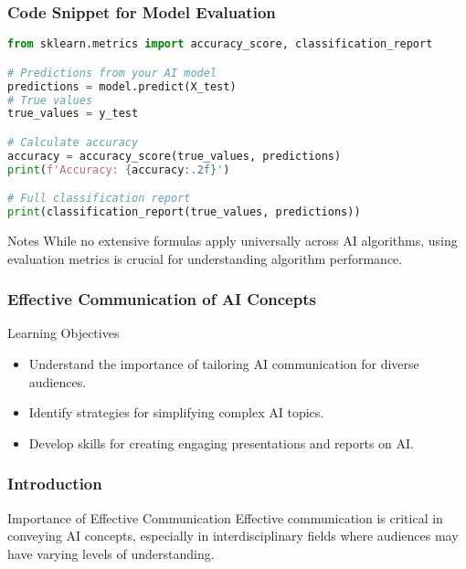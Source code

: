 \documentclass[aspectratio=169]{beamer}
\begin{document}
\begin{frame}[fragile]
    \frametitle{Code Snippet for Model Evaluation}
    \begin{lstlisting}[language=Python]
from sklearn.metrics import accuracy_score, classification_report

# Predictions from your AI model
predictions = model.predict(X_test)
# True values
true_values = y_test

# Calculate accuracy
accuracy = accuracy_score(true_values, predictions)
print(f'Accuracy: {accuracy:.2f}')

# Full classification report
print(classification_report(true_values, predictions))
    \end{lstlisting}
    \begin{block}{Notes}
        While no extensive formulas apply universally across AI algorithms, using evaluation metrics is crucial for understanding algorithm performance.
    \end{block}
\end{frame}

\begin{frame}[fragile]
    \frametitle{Effective Communication of AI Concepts}
    \begin{block}{Learning Objectives}
        \begin{itemize}
            \item Understand the importance of tailoring AI communication for diverse audiences.
            \item Identify strategies for simplifying complex AI topics.
            \item Develop skills for creating engaging presentations and reports on AI.
        \end{itemize}
    \end{block}
\end{frame}

\begin{frame}[fragile]
    \frametitle{Introduction}
    \begin{block}{Importance of Effective Communication}
        Effective communication is critical in conveying AI concepts, especially in interdisciplinary fields where audiences may have varying levels of understanding.
    \end{block}
\end{frame}
\end{document}
